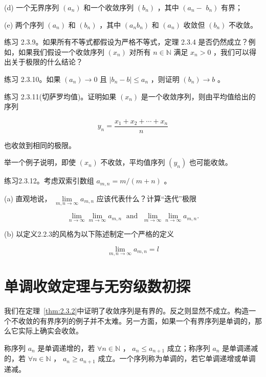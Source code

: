 (d) 一个无界序列 \(\left( {a}_{n}\right)\) 和一个收敛序列 \(\left( {b}_{n}\right)\) ，其中 \(\left( {{a}_{n} - }\right.\)  \(\left. {b}_{n}\right)\) 有界；

(e) 两个序列 \(\left( {a}_{n}\right)\) 和 \(\left( {b}_{n}\right)\) ，其中 \(\left( {{a}_{n}{b}_{n}}\right)\) 和 \(\left( {a}_{n}\right)\) 收敛但 \(\left( {b}_{n}\right)\) 不收敛。

练习 2.3.9。如果所有不等式都假设为严格不等式，定理 2.3.4 是否仍然成立？例如，如果我们假设一个收敛序列 \(\left( {x}_{n}\right)\) 对所有 \(n \in  \mathbb{N}\) 满足 \({x}_{n} > 0\) ，我们可以得出关于极限的什么结论？

练习 2.3.10。如果 \(\left( {a}_{n}\right)  \rightarrow  0\) 且 \(\left| {{b}_{n} - b}\right|  \leq  {a}_{n}\) ，则证明 \(\left( {b}_{n}\right)  \rightarrow  b\) 。

练习 2.3.11(切萨罗均值)。证明如果 \(\left( {x}_{n}\right)\) 是一个收敛序列，则由平均值给出的序列

\[
{y}_{n} = \frac{{x}_{1} + {x}_{2} + \cdots  + {x}_{n}}{n}
\]

也收敛到相同的极限。

举一个例子说明，即使 \(\left( {x}_{n}\right)\) 不收敛，平均值序列 \(\left( {y}_{n}\right)\) 也可能收敛。

练习2.3.12。考虑双索引数组 \({a}_{m,n} = m/\left( {m + n}\right)\) 。

(a) 直观地说， \(\mathop{\lim }\limits_{{m,n \rightarrow  \infty }}{a}_{m,n}\) 应该代表什么？计算“迭代”极限

\[
\mathop{\lim }\limits_{{n \rightarrow  \infty }}\mathop{\lim }\limits_{{m \rightarrow  \infty }}{a}_{m,n}\;\text{ and }\;\mathop{\lim }\limits_{{m \rightarrow  \infty }}\mathop{\lim }\limits_{{n \rightarrow  \infty }}{a}_{m,n}.
\]

(b) 以定义2.2.3的风格为以下陈述制定一个严格的定义

\[
\mathop{\lim }\limits_{{m,n \rightarrow  \infty }}{a}_{m,n} = l
\]

\section{单调收敛定理与无穷级数初探}
\label{sec:2.4}
我们在定理~\ref{thm:2.3.2}中证明了收敛序列是有界的。反之则显然不成立。构造一个不收敛的有界序列的例子并不太难。另一方面，如果一个有界序列是单调的，那么它实际上确实会收敛。

\begin{Def}
  \label{def:2.4.1}
  称序列 $a_n$ 是单调递增的，若 \(\forall n \in  \mathbb{N}\) ， \({a}_{n} \leq  {a}_{n + 1}\) 成立；称序列 $a_n$ 是单调递减的，若 \(\forall n \in  \mathbb{N}\) ， \({a}_{n} \geq  {a}_{n + 1}\) 成立。一个序列称为单调的，若它单调递增或单调递减。
\end{Def}

